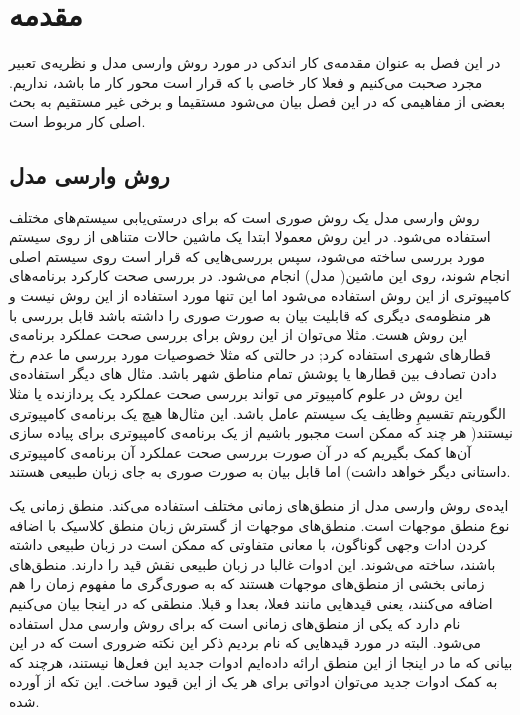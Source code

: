 \pagestyle{plain}
\setcounter{page}{1}

\chapter{مقدمه}

در این فصل به عنوان مقدمه‌ی کار اندکی در مورد روش وارسی مدل و نظریه‌ی تعبیر مجرد صحبت می‌کنیم و فعلا کار خاصی با \cite{calcul} که قرار است محور کار ما باشد، نداریم. بعضی از مفاهیمی که در این فصل بیان می‌شود مستقیما و برخی غیر مستقیم به بحث اصلی کار مربوط است.

\section{روش وارسی مدل}

روش وارسی مدل یک روش صوری است که برای درستی‌یابی سیستم‌های مختلف استفاده می‌شود. در این روش معمولا ابتدا یک ماشین حالات متناهی از روی سیستم مورد بررسی ساخته می‌شود، سپس بررسی‌هایی که قرار است روی سیستم اصلی انجام شوند، روی این ماشین( مدل) انجام می‌شود. در بررسی صحت کارکرد برنامه‌های کامپیوتری از این روش استفاده می‌شود اما این تنها مورد استفاده از این روش نیست و هر منظومه‌ی دیگری که قابلیت بیان به صورت صوری را داشته باشد قابل بررسی با این روش هست. مثلا می‌توان از این روش برای بررسی صحت عملکرد برنامه‌ی قطارهای شهری استفاده کرد; در حالتی که مثلا خصوصیات مورد بررسی ما عدم رخ دادن تصادف بین قطارها یا پوشش تمام  مناطق شهر باشد. مثال های دیگر استفاده‌ی این روش در علوم کامپیوتر می تواند بررسی صحت عملکرد یک پردازنده یا مثلا الگوریتم تقسیمِ وظایف یک سیستم عامل باشد. این مثال‌ها هیچ یک برنامه‌ی کامپیوتری نیستند( هر چند که ممکن است مجبور باشیم از یک برنامه‌ی کامپیوتری برای پیاده سازی آن‌ها کمک بگیریم که در آن صورت بررسی صحت عملکرد آن برنامه‌ی کامپیوتری داستانی دیگر خواهد داشت) اما قابل بیان به صورت صوری به جای زبان طبیعی هستند.

ایده‌ی روش وارسی مدل از منطق‌های زمانی مختلف استفاده می‌کند. منطق زمانی یک نوع منطق موجهات است. منطق‌های موجهات از گسترش زبان منطق کلاسیک با اضافه کردن ادات وجهی گوناگون، با معانی متفاوتی که ممکن است در زبان طبیعی داشته باشند، ساخته می‌شوند. این ادوات غالبا در زبان طبیعی نقش قید را دارند. منطق‌های زمانی بخشی از منطق‌های موجهات هستند که به صوری‌گری ما مفهوم زمان را هم اضافه می‌کنند، یعنی قیدهایی مانند فعلا، بعدا و قبلا. منطقی که در اینجا بیان می‌کنیم  نام دارد که یکی از منطق‌های زمانی است که برای روش وارسی مدل استفاده می‌شود. البته در مورد قیدهایی که نام بردیم ذکر این نکته ضروری است که در این بیانی که ما در اینجا از این منطق ارائه داده‌ایم ادوات جدید این فعل‌ها نیستند، هرچند که به کمک ادوات جدید می‌توان ادواتی برای هر یک از این قیود ساخت.
این تکه از \cite{buchi} آورده شده.

